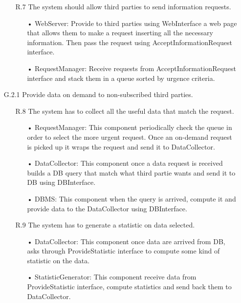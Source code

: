 \begin{enumerate}
\begin{enumerate}
	\item [R.7] The system should allow third parties to send information requests.
		\begin{enumerate}
		\item[•] WebServer: Provide to third parties using WebInterface a web page that allows them to make a request inserting all the necessary information. Then pass the request using AcceptInformationRequest interface.
		\item[•] RequestManager: Receive requests from AcceptInformationRequest interface and stack them in a queue sorted by urgence criteria.
		\end{enumerate}	
	\end{enumerate}

\item [G.2.1] Provide data on demand to non-subscribed third parties.
	\begin{enumerate}
	\item [R.8] The system has to collect all the useful data that match the request.
		\begin{enumerate}
		\item[•] RequestManager: This component periodically check the queue in order to select the more urgent request. Once an on-demand request is picked up it wraps the request and send it to DataCollector.
		\item[•] DataCollector: This component once a data request is received builds a DB query that match what third partie wants and send it to DB using DBInterface.
		\item[•] DBMS: This component when the query is arrived, compute it and provide data to the DataCollector using DBInterface.
		\end{enumerate}	
			
	\item [R.9] The system has to generate a statistic on data selected.
		\begin{enumerate}
		\item[•] DataCollector: This component once data are arrived from DB, asks through ProvideStatistic interface to compute some kind of statistic on the data.
		\item[•] StatisticGenerator: This component receive data from ProvideStatistic interface, compute statistics and send back them to DataCollector.
		\end{enumerate}	
		

\end{enumerate}
\end{enumerate}
